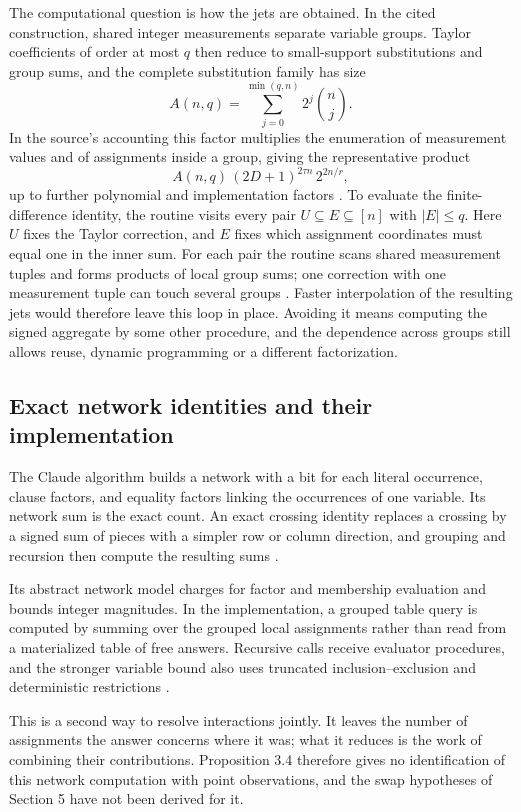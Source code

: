 \documentclass[11pt,letterpaper]{article}
\begin{document}
The computational question is how the jets are obtained. In the cited
construction, shared integer measurements separate variable groups.
Taylor coefficients of order at most \(q\) then reduce to small-support
substitutions and group sums, and the complete substitution family has
size \[A(n,q)=\sum_{j=0}^{\min(q,n)}2^j\binom nj.\] In the source's
accounting this factor multiplies the enumeration of measurement values
and of assignments inside a group, giving the representative product
\[A(n,q)\,(2D+1)^{2\tau n}\,2^{2n/r},\] up to further polynomial and
implementation factors \citep{O26}. To evaluate the finite-difference
identity, the routine visits every pair \(U\subseteq E\subseteq[n]\)
with \(|E|\le q\). Here \(U\) fixes the Taylor correction, and \(E\)
fixes which assignment coordinates must equal one in the inner sum. For
each pair the routine scans shared measurement tuples and forms products
of local group sums; one correction with one measurement tuple can touch
several groups \citep[Sections 3.3--3.5]{O26}. Faster interpolation of
the resulting jets would therefore leave this loop in place. Avoiding it
means computing the signed aggregate by some other procedure, and the
dependence across groups still allows reuse, dynamic programming or a
different factorization.

\subsection{Exact network identities and their
implementation}\label{exact-network-identities-and-their-implementation}

The Claude algorithm builds a network with a bit for each literal
occurrence, clause factors, and equality factors linking the occurrences
of one variable. Its network sum is the exact count. An exact crossing
identity replaces a crossing by a signed sum of pieces with a simpler
row or column direction, and grouping and recursion then compute the
resulting sums \citep[Sections 3--6]{Ant26}.

Its abstract network model charges for factor and membership evaluation
and bounds integer magnitudes. In the implementation, a grouped table
query is computed by summing over the grouped local assignments rather
than read from a materialized table of free answers. Recursive calls
receive evaluator procedures, and the stronger variable bound also uses
truncated inclusion--exclusion and deterministic restrictions
\citep[Appendices B--D]{Ant26}.

This is a second way to resolve interactions jointly. It leaves the
number of assignments the answer concerns where it was; what it reduces
is the work of combining their contributions. Proposition 3.4 therefore
gives no identification of this network computation with point
observations, and the swap hypotheses of Section 5 have not been derived
for it.
\end{document}

